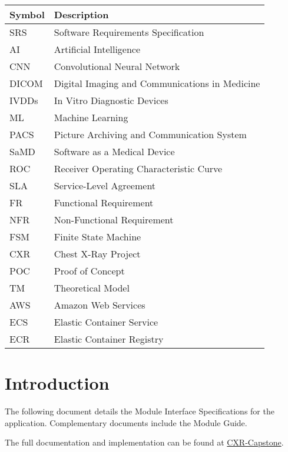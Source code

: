 \documentclass[12pt, titlepage]{article}
\begin{document}
\renewcommand{\arraystretch}{1.3}
\noindent \begin{tabular}{l l} 
  \toprule		
  \textbf{Symbol} & \textbf{Description}\\
  \midrule 
  SRS & Software Requirements Specification\\
  AI & Artificial Intelligence\\
  CNN & Convolutional Neural Network\\
  DICOM & Digital Imaging and Communications in Medicine\\
  IVDDs & In Vitro Diagnostic Devices\\
  ML & Machine Learning\\
  PACS & Picture Archiving and Communication System\\
  SaMD & Software as a Medical Device\\
  ROC & Receiver Operating Characteristic Curve\\
  SLA & Service-Level Agreement\\
  FR & Functional Requirement\\
  NFR & Non-Functional Requirement\\
  FSM & Finite State Machine\\
  CXR & Chest X-Ray Project\\
  POC & Proof of Concept\\
  TM & Theoretical Model\\
  AWS & Amazon Web Services\\
  ECS & Elastic Container Service\\
  ECR & Elastic Container Registry\\
  \bottomrule
\end{tabular}

\newpage

\tableofcontents

\newpage


\section{Introduction}

The following document details the Module Interface Specifications for the
 application. Complementary documents include the Module Guide.

\noindent The full documentation and implementation can be found at \href{https://github.com/RezaJodeiri/CXR-Capstone}{CXR-Capstone}.
\end{document}
